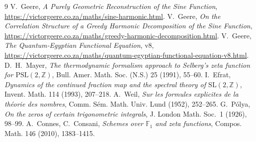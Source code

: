 \documentclass[11pt,a4paper]{article}
\begin{document}
\begin{thebibliography}{9}
V.~Geere, \emph{A Purely Geometric Reconstruction of the Sine Function}, \url{https://victorgeere.co.za/maths/sine-harmonic.html}.
V.~Geere, \emph{On the Correlation Structure of a Greedy Harmonic Decomposition of the Sine Function}, \url{https://victorgeere.co.za/maths/greedy-harmonic-decomposition.html}.
V.~Geere, \emph{The Quantum‑Egyptian Functional Equation}, v8, \url{https://victorgeere.co.za/maths/quantum-egyptian-functional-equation-v8.html}.
D.~H.~Mayer, \emph{The thermodynamic formalism approach to Selberg's zeta function for \(\mathrm{PSL}(2,\mathbb{Z})\)}, Bull. Amer. Math. Soc. (N.S.) 25 (1991), 55--60.
I.~Efrat, \emph{Dynamics of the continued fraction map and the spectral theory of \(\mathrm{SL}(2,\mathbb{Z})\)}, Invent. Math. 114 (1993), 207--218.
A.~Weil, \emph{Sur les formules explicites de la th\'eorie des nombres}, Comm. S\'em. Math. Univ. Lund (1952), 252--265.
G.~P\'olya, \emph{On the zeros of certain trigonometric integrals}, J. London Math. Soc.~1 (1926), 98--99.
A.~Connes, C.~Consani, \emph{Schemes over \(\mathbb{F}_1\) and zeta functions}, Compos. Math. 146 (2010), 1383--1415.
\end{thebibliography}
\end{document}
